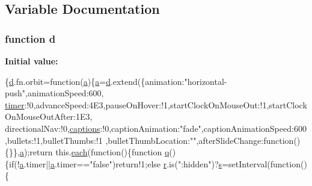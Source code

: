 \subsection{Variable Documentation}
\hypertarget{jquery_8orbit-1_82_83_8min_8js_a36541169dfff685f807208881a4f0021}{
\subsubsection[{d}]{\setlength{\rightskip}{0pt plus 5cm}function d}}\label{jquery_8orbit-1_82_83_8min_8js_a36541169dfff685f807208881a4f0021}
{\bfseries Initial value\+:}
\begin{DoxyCode}
\{\hyperlink{jquery_8orbit-1_82_83_8min_8js_a36541169dfff685f807208881a4f0021}{d}.fn.orbit=\textcolor{keyword}{function}(\hyperlink{chosen_8jquery_8min_8js_a4124bc0a9335c27f086f24ba207a4912}{a})\{\hyperlink{chosen_8jquery_8min_8js_a4124bc0a9335c27f086f24ba207a4912}{a}=\hyperlink{jquery_8orbit-1_82_83_8min_8js_a36541169dfff685f807208881a4f0021}{d}.extend(\{animation:\textcolor{stringliteral}{"horizontal-push"},animationSpeed:600,
      \hyperlink{jquery-1_89_81_8js_a2b44b4db680ed005831a801cef9f8bb3}{timer}:!0,advanceSpeed:4E3,pauseOnHover:!1,startClockOnMouseOut:!1,startClockOnMouseOutAfter:1E3,
      directionalNav:!0,\hyperlink{core_8constructor_8js_ae6f83497ac9c36a4dde29f87660a38ae}{captions}:!0,captionAnimation:\textcolor{stringliteral}{"fade"},captionAnimationSpeed:600,bullets:!1,bulletThumbs:!1
      ,bulletThumbLocation:\textcolor{stringliteral}{""},afterSlideChange:\textcolor{keyword}{function}()\{\}\},\hyperlink{chosen_8jquery_8min_8js_a4124bc0a9335c27f086f24ba207a4912}{a});\textcolor{keywordflow}{return} this.\hyperlink{docs_2media_2js_2jquery_8js_a3e2a9dd26aa3dd18bfa17f4a59981d56}{each}(\textcolor{keyword}{function}()\{\textcolor{keyword}{function} 
      \hyperlink{_fixed_columns_8min_8js_a53e2359402d7f3765cf1cda82ee7c11b}{q}()\{\textcolor{keywordflow}{if}(!\hyperlink{chosen_8jquery_8min_8js_a4124bc0a9335c27f086f24ba207a4912}{a}.timer||\hyperlink{chosen_8jquery_8min_8js_a4124bc0a9335c27f086f24ba207a4912}{a}.timer==\textcolor{stringliteral}{"false"})\textcolor{keywordflow}{return}!1;\textcolor{keywordflow}{else} \hyperlink{prism_8js_a514f1b439f404f86f77090fa9edc96ce}{r}.is(\textcolor{stringliteral}{":hidden"})?\hyperlink{validate_8js_ae059f217efaf1d50696a1214c3ce5748}{s}=setInterval(\textcolor{keyword}{function}()\{

\end{DoxyCode}
